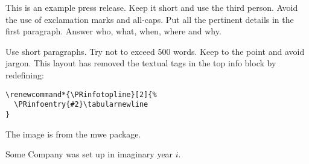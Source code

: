 \documentclass[a4paper,11pt]{pressrelease}
\date{Some City, \today}
\renewcommand*{\PRinfotopline}[2]{%
  \PRinfoentry{#2}\tabularnewline
}
\begin{document}
\begin{pressrelease}

This is an example press release. Keep it short and use the third
person. Avoid the use of exclamation marks and all-caps. Put all the
pertinent details in the first paragraph. Answer who, what, when,
where and why.

Use short paragraphs. Try not to exceed 500 words. Keep to the point
and avoid jargon. This layout has removed the textual tags in the
top info block by redefining: 
\begin{verbatim}
\renewcommand*{\PRinfotopline}[2]{%
  \PRinfoentry{#2}\tabularnewline
}
\end{verbatim}
The image is from the
\textsf{mwe} package.

\begin{about}
Some Company was set up in imaginary year $i$.
\end{about}

\end{pressrelease}
\end{document}
